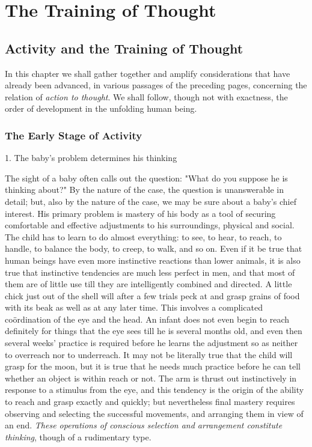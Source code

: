 \documentclass[letterpaper]{book}
\begin{document}
\part{The Training of Thought}

\chapter{Activity and the Training of Thought}

In this chapter we shall gather together and amplify considerations that
have already been advanced, in various passages of the preceding pages,
concerning the relation of \emph{action to thought}. We shall follow,
though not with exactness, the order of development in the unfolding
human being.

\section{The Early Stage of Activity}

1. The baby's problem determines his thinking

The sight of a baby often calls out the question: "What do you suppose
he is thinking about?" By the nature of the case, the question is
unanswerable in detail; but, also by the nature of the case, we may be
sure about a baby's chief interest. His primary problem is mastery of
his body as a tool of securing comfortable and effective adjustments to
his surroundings, physical and social. The child has to learn to do
almost everything: to see, to hear, to reach, to handle, to balance the
body, to creep, to walk, and so on. Even if it be true that human beings
have even more instinctive reactions than lower animals, it is also true
that instinctive tendencies are much less perfect in men, and that most
of them
are
of little use till they are intelligently combined and directed. A
little chick just out of the shell will after a few trials peck at and
grasp grains of food with its beak as well as at any later time. This
involves a complicated coördination of the eye and the head. An infant
does not even begin to reach definitely for things that the eye sees
till he is several months old, and even then several weeks' practice is
required before he learns the adjustment so as neither to overreach nor
to underreach. It may not be literally true that the child will grasp
for the moon, but it is true that he needs much practice before he can
tell whether an object is within reach or not. The arm is thrust out
instinctively in response to a stimulus from the eye, and this tendency
is the origin of the ability to reach and grasp exactly and quickly; but
nevertheless final mastery requires observing and selecting the
successful movements, and arranging them in view of an end. \emph{These
operations of conscious selection and arrangement constitute thinking},
though of a rudimentary type.
\end{document}
